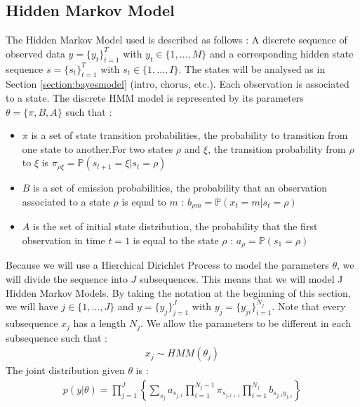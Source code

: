 \subsection{Hidden Markov Model}
The Hidden Markov Model used is described as follows : A discrete sequence of observed data $y=\{y_t\}^T_{t=1}$ with $y_t \in \{1,\dots, M \}$ and a corresponding hidden state sequence $s=\{s_t\}^T_{t=1}$ with $s_t \in \{ 1, \dots, I \}$. The states will be analysed as in Section \ref{section:bayesmodel} (intro, chorus, etc.). Each observation is associated to a state. The discrete HMM model is represented by its parameters $\theta=\{\pi,B,A\}$ such that : 
\begin{itemize}
	\item $\pi$ is a set of state transition probabilities, the probability to transition from one state to another.For two states $\rho$ and $\xi$, the transition probability from $\rho$ to $\xi$ is $\pi_{\rho\xi}=\mathbb P(s_{t+1}=\xi | s_t=\rho)$
	\item $B$ is a set of emission probabilities, the probability that an observation associated to a state $\rho$ is equal to $m$ : $b_{\rho m}=\mathbb P(x_t= m | s_t=\rho)$
	\item  $A$ is the set of initial state distribution, the probability that the first observation in time $t=1$ is equal to the state $\rho$ : $a_{\rho}=\mathbb P(s_1=\rho)$
\end{itemize}
Because we will use a Hierchical Dirichlet Process to model the parameters $\theta$, we will divide the sequence into $J$ subsequences. This means that we will model J Hidden Markov Models. By taking the notation at the beginning of this section, we will have $j\in \{1, \dots, J\}$ and $y=\{y_j\}_{j=1}^J$ with $y_j=\{ y_{ji}\}_{i=1}^{N_j}$. Note that every subsequence $x_j$ has a length $N_j$. We allow the parameters to be different in each subsequence such that : \begin{align*}
 		x_j \sim HMM(\theta_j)
 \end{align*}
The joint distribution given $\theta$ is : 
\begin{align*}
	p(y|\theta)=\prod^J_{j=1}\left\{ \sum_{s_j}a_{s_{j,1}}\prod^{N_j-1}_{i=1}\pi_{s_{j,i+1}} \prod^{N_j}_{i=1} b_{s_{j,i}y_{j,i}} \right\}
\end{align*}

